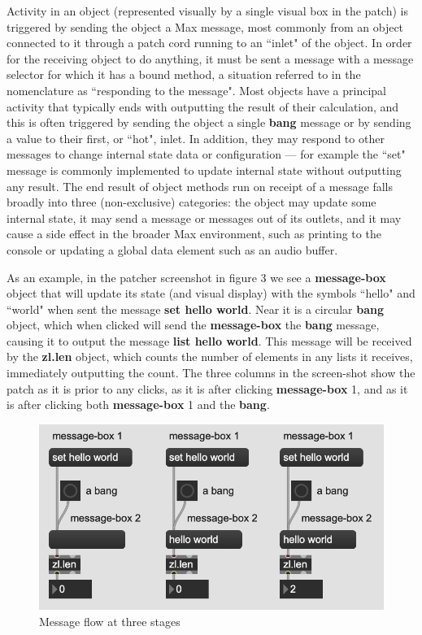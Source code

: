 \documentclass[acmsmall]{acmart}
\begin{document}
Activity in an object (represented visually by a single visual box in the patch) is triggered
by sending the object a Max message, most commonly from an object connected to it
through a patch cord running to an ``inlet" of the object. 
In order for the receiving object to do anything, it must 
be sent a message with a message selector for which it has a bound method,
a situation referred to in the nomenclature as ``responding to the message". Most objects
have a principal activity that typically ends with outputting the result of their calculation, and this is
often triggered by sending the object a single \textbf{bang} message or by sending a value to 
their first, or ``hot", inlet. In addition, they may respond to other messages to change internal state
data or configuration --- for example the ``set" message is commonly implemented to update internal
state without outputting any result. The end result of object methods run on receipt of a message falls broadly
into three (non-exclusive) categories: the object may update some internal state, it may send a
message or messages out of its outlets, and it may cause a side effect in the broader
Max environment, such as printing to the console or updating a global data element such as
an audio buffer.

As an example, in the patcher screenshot in figure 3 we see a \textbf{message-box} object that will update
its state (and visual display) with the symbols ``hello" and ``world" when sent the message 
\textbf{set hello world}. Near it is a circular \textbf{bang} object, which when clicked will send the
\textbf{message-box} the \textbf{bang} message, causing it to output the message \textbf{list hello world}.
This message will be received by the \textbf{zl.len} object, which counts the number of elements 
in any lists it receives, immediately outputting the count. The three columns in the screen-shot
show the patch as it is prior to any clicks, as it is after clicking \textbf{message-box} 1,
and as it is after clicking both \textbf{message-box} 1 and the \textbf{bang}.

\begin{figure}[H]
  \centering
  \includegraphics[width=.5\linewidth]{fig-2-message-flow}
  \caption{Message flow at three stages}
\end{figure}
\end{document}
